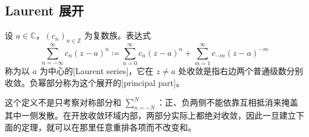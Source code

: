 \subsection{Laurent 展开}
\label{b3:subsec:030102}

\begin{definition}\label{b3:def:03-laurent-series}
设 \(a\in\mathbb C\)，\((c_n)_{n\in\mathbb Z}\) 为复数族。表达式
\[
 \sum_{n=-\infty}^{\infty}c_n(z-a)^n
 \coloneqq\sum_{n=0}^{\infty}c_n(z-a)^n
 +\sum_{m=1}^{\infty}c_{-m}(z-a)^{-m}
\]
称为以 \(a\) 为中心的[Laurent series]，它在 \(z\ne a\) 处收敛是指右边两个普通级数分别收敛。负幂部分称为这个展开的[principal part]。
\end{definition}

这个定义不是只考察对称部分和 \(\sum_{n=-N}^N\)：正、负两侧不能依靠互相抵消来掩盖其中一侧发散。在开放收敛环域内部，两部分实际上都绝对收敛，因此一旦建立下面的定理，就可以在那里任意重排各项而不改变和。

